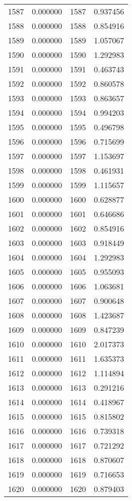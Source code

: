 \documentclass[12pt]{article}
\begin{document}
\begin{longtable}{@{}cccc@{}}
1587 & 0.000000 & 1587 & 0.937456 \\
1588 & 0.000000 & 1588 & 0.854916 \\
1589 & 0.000000 & 1589 & 1.057067 \\
1590 & 0.000000 & 1590 & 1.292983 \\
1591 & 0.000000 & 1591 & 0.463743 \\
1592 & 0.000000 & 1592 & 0.860578 \\
1593 & 0.000000 & 1593 & 0.863657 \\
1594 & 0.000000 & 1594 & 0.994203 \\
1595 & 0.000000 & 1595 & 0.496798 \\
1596 & 0.000000 & 1596 & 0.715699 \\
1597 & 0.000000 & 1597 & 1.153697 \\
1598 & 0.000000 & 1598 & 0.461931 \\
1599 & 0.000000 & 1599 & 1.115657 \\
1600 & 0.000000 & 1600 & 0.628877 \\
1601 & 0.000000 & 1601 & 0.646686 \\
1602 & 0.000000 & 1602 & 0.854916 \\
1603 & 0.000000 & 1603 & 0.918449 \\
1604 & 0.000000 & 1604 & 1.292983 \\
1605 & 0.000000 & 1605 & 0.955093 \\
1606 & 0.000000 & 1606 & 1.063681 \\
1607 & 0.000000 & 1607 & 0.900648 \\
1608 & 0.000000 & 1608 & 1.423687 \\
1609 & 0.000000 & 1609 & 0.847239 \\
1610 & 0.000000 & 1610 & 2.017373 \\
1611 & 0.000000 & 1611 & 1.635373 \\
1612 & 0.000000 & 1612 & 1.114894 \\
1613 & 0.000000 & 1613 & 0.291216 \\
1614 & 0.000000 & 1614 & 0.418967 \\
1615 & 0.000000 & 1615 & 0.815802 \\
1616 & 0.000000 & 1616 & 0.739318 \\
1617 & 0.000000 & 1617 & 0.721292 \\
1618 & 0.000000 & 1618 & 0.870607 \\
1619 & 0.000000 & 1619 & 0.716653 \\
1620 & 0.000000 & 1620 & 0.879403 \\

\end{longtable}
\end{document}
